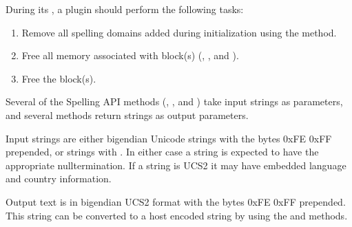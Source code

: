 \documentclass[letterpaper,12pt,english,openany,oneside]{sphinxmanual}
\begin{document}
During its , a plugin should perform the following tasks:
\begin{enumerate}
%
\item {} 
Remove all spelling domains added during initialization using the  method.

\item {} 
Free all memory associated with  block(s) (, , and  ).

\item {} 
Free the  block(s).

\end{enumerate}

Several of the Spelling API methods (, , and  ) take input strings as parameters, and several methods return strings as output parameters.

Input strings are either big\sphinxhyphen{}endian Unicode strings with the bytes 0xFE 0xFF prepended, or strings with . In either case a string is expected to have the appropriate null\sphinxhyphen{}termination. If a string is UCS\sphinxhyphen{}2 it may have embedded language and country information.

Output text is in big\sphinxhyphen{}endian UCS\sphinxhyphen{}2 format with the bytes 0xFE 0xFF prepended. This string can be converted to a host encoded string by using the  and  methods.

\begin{sphinxVerbatim}[commandchars=\\\{\}]
   
    
         
   
        \PYG{p}{[}\PYG{p}{]}
         
      
\end{sphinxVerbatim}
\end{document}
